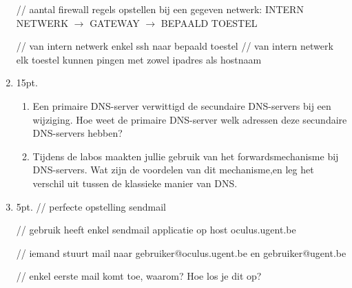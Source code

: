 \documentclass{article}
\def\note#1{\color{cyan} #1 \color{black}}
\begin{document}
\begin{enumerate}
    
    // aantal firewall regels opstellen bij een gegeven netwerk: INTERN NETWERK $\rightarrow$ GATEWAY $\rightarrow$ BEPAALD TOESTEL
    
    // van intern netwerk enkel ssh naar bepaald toestel
                                                                      // van intern netwerk elk toestel kunnen pingen met zowel ipadres als hostnaam
    \item \note{15pt.}  \begin{enumerate}
                \item Een primaire DNS-server verwittigd de secundaire DNS-servers bij een wijziging. Hoe weet de primaire DNS-server welk adressen deze secundaire DNS-servers hebben?
                \item Tijdens de labos maakten jullie gebruik van het forwardsmechanisme bij DNS-servers. Wat zijn de voordelen van dit mechanisme,en leg het verschil uit tussen de klassieke manier van DNS. 
            \end{enumerate}
    \item \note{5pt.} // perfecte opstelling sendmail

                      // gebruik heeft enkel sendmail applicatie op host oculus.ugent.be

                      // iemand stuurt mail naar gebruiker@oculus.ugent.be en gebruiker@ugent.be

                      // enkel eerste mail komt toe, waarom? Hoe los je dit op?

\end{enumerate}


	
    
\end{document}
